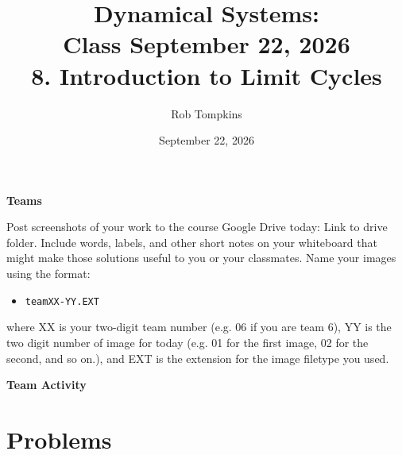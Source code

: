 \documentclass[12pt]{amsart}
\title{Dynamical Systems:\\Class September 22, 2026\\ 8. Introduction to Limit Cycles}
\author{Rob Tompkins}
\date{September 22, 2026}
\theoremstyle{plain}
\theoremstyle{definition}
\theoremstyle{definition}
\theoremstyle{plain}
\begin{document}
    \maketitle
    {\large\bfseries Teams}

    Post screenshots of your work to the course Google Drive today: Link to drive folder. Include words, labels, and other short notes on your whiteboard that might make those solutions useful to you or your classmates. Name your images using the format:
    \begin{itemize}\item \texttt{teamXX-YY.EXT}\end{itemize}
    where XX is your two-digit team number (e.g. 06 if you are team 6), YY is the two digit number of image for today (e.g. 01 for the first image, 02 for the second, and so on.), and EXT is the extension for the image filetype you used.
    \par\medskip
    {\large\bfseries Team Activity}

    \section*{Problems}
\end{document}
